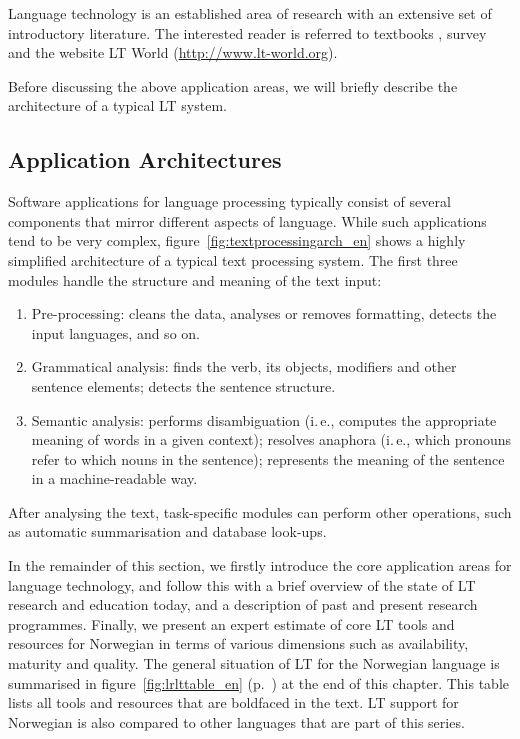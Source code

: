 \begin{multicols}{2}
Language technology is an established area of research with an extensive set of introductory literature.
The interested reader is referred to textbooks \cite{jurafsky-martin01, manning-schuetze1}, survey \cite{lt-survey1} and the website LT World (\url{http://www.lt-world.org}).

Before discussing the above application areas, we will briefly describe the architecture of a typical LT system.

\subsection{Application Architectures}

Software applications for language processing typically consist of several components that mirror different aspects of language. While such applications tend to be very complex, figure~\ref{fig:textprocessingarch_en} shows a highly simplified architecture of a typical text processing system. The first three modules handle the structure and meaning of the text input:

\begin{enumerate}
\item Pre-processing: cleans the data, analyses or removes formatting, detects the input languages, and so on.
\item Grammatical analysis: finds the verb, its objects, modifiers and other sentence elements; detects the sentence structure.
\item Semantic analysis: performs disambiguation (i.\,e., computes the appropriate meaning of words in a given context); resolves anaphora (i.\,e., which pronouns refer to which nouns in the sentence); represents the meaning of the sentence in a machine-readable way.
\end{enumerate}

After analysing the text, task-specific modules can perform other operations, such as automatic summarisation and database look-ups.

In the remainder of this section, we firstly introduce the core application areas for language technology, and follow this with a brief overview of the state of LT research and education today, and a description of past and present research programmes. Finally, we present an expert estimate of core LT tools and resources for Norwegian in terms of various dimensions such as availability, maturity and quality. The general situation of LT for the Norwegian language is summarised in figure~\ref{fig:lrlttable_en} (p.~\pageref{fig:lrlttable_en}) at the end of this chapter. This table lists all tools and resources that are boldfaced in the text. LT support for Norwegian is also compared to other languages that are part of this series.


\end{multicols}
